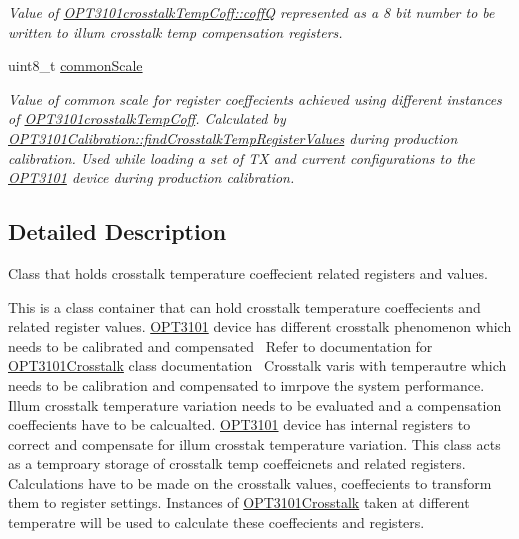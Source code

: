 \begin{DoxyCompactItemize}
\begin{DoxyCompactList}\small\item\em Value of \mbox{\hyperlink{class_o_p_t3101crosstalk_temp_coff_a6d2ce80b4e1936571777185f302305b5}{O\+P\+T3101crosstalk\+Temp\+Coff\+::coffQ}} represented as a 8 bit number to be written to illum crosstalk temp compensation registers. \end{DoxyCompactList}\item 
uint8\+\_\+t \mbox{\hyperlink{class_o_p_t3101crosstalk_temp_coff_a23ec6b8c3190fefad73d747864a0b10f}{common\+Scale}}
\begin{DoxyCompactList}\small\item\em Value of common scale for register coeffecients achieved using different instances of \mbox{\hyperlink{class_o_p_t3101crosstalk_temp_coff}{O\+P\+T3101crosstalk\+Temp\+Coff}}. Calculated by \mbox{\hyperlink{class_o_p_t3101_calibration_ab4a9d45a3175bec9d2d5c2967cc0348f}{O\+P\+T3101\+Calibration\+::find\+Crosstalk\+Temp\+Register\+Values}} during production calibration. Used while loading a set of TX and current configurations to the \mbox{\hyperlink{namespace_o_p_t3101}{O\+P\+T3101}} device during production calibration. \end{DoxyCompactList}\end{DoxyCompactItemize}


\subsection{Detailed Description}
Class that holds crosstalk temperature coeffecient related registers and values. 

This is a class container that can hold crosstalk temperature coeffecients and related register values. \mbox{\hyperlink{namespace_o_p_t3101}{O\+P\+T3101}} device has different crosstalk phenomenon which needs to be calibrated and compensated~\newline
 Refer to documentation for \mbox{\hyperlink{class_o_p_t3101_crosstalk}{O\+P\+T3101\+Crosstalk}} class documentation~\newline
 Crosstalk varis with temperautre which needs to be calibration and compensated to imrpove the system performance. Illum crosstalk temperature variation needs to be evaluated and a compensation coeffecients have to be calcualted. \mbox{\hyperlink{namespace_o_p_t3101}{O\+P\+T3101}} device has internal registers to correct and compensate for illum crosstak temperature variation. This class acts as a temproary storage of crosstalk temp coeffeicnets and related registers. Calculations have to be made on the crosstalk values, coeffecients to transform them to register settings. Instances of \mbox{\hyperlink{class_o_p_t3101_crosstalk}{O\+P\+T3101\+Crosstalk}} taken at different temperatre will be used to calculate these coeffecients and registers. 


